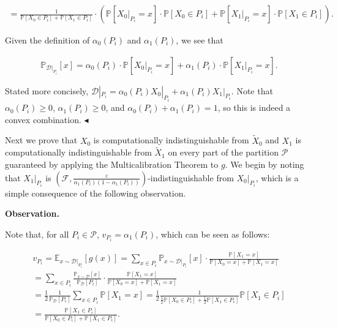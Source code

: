 \documentclass[10pt,a4paper]{article}
\begin{document}
\[\begin{gathered}
=\frac{1}{\mathbb{P}[X_{0}\in P_{i}]+\mathbb{P}[X_{1}\in P_{i}]}\cdot\left(\mathbb{P}[X_{0}|_{P_{i}}=x]\cdot\mathbb{P}[X_{0}\in P_{i}]+\mathbb{P}[X_{1}|_{P_{i}}=x]\cdot\mathbb{P}[X_{1}\in P_{i}]\right).
\end{gathered}\]


Given the definition of $\alpha_{0}(P_{i})$ and $\alpha_{1}(P_{i})$, we see that\par


\[\begin{gathered}
\mathbb{P}_{\mathcal{D}|_{P_{i}}}[x]=\alpha_{0}(P_{i})\cdot\mathbb{P}[X_{0}|_{P_{i}}=x]+\alpha_{1}(P_{i})\cdot\mathbb{P}[X_{1}|_{P_{i}}=x].
\end{gathered}\]


Stated more concisely, $\mathcal{D}|_{P_{i}}=\alpha_{0}(P_{i})X_{0}|_{P_{i}}+\alpha_{1}(P_{i})X_{1}|_{P_{i}}$. Note that $\alpha_{0}(P_{i})\geq 0$, $\alpha_{1}(P_{i})\geq 0$, and $\alpha_{0}(P_{i})+\alpha_{1}(P_{i})=1$, so this is indeed a convex combination.
$\blacktriangleleft$\par




Next we prove that $X_{0}$ is computationally indistinguishable from $\widetilde{X}_{0}$ and $X_{1}$ is computationally indistinguishable from $\widetilde{X}_{1}$ on every part of the partition $\mathcal{P}$ guaranteed by applying the Multicalibration Theorem to $g$. We begin by noting that $X_{1}|_{P_{i}}$ is $(\mathcal{F},\frac{\varepsilon}{\alpha_{1}(P_{i})(1-\alpha_{1}(P_{i}))})$-indistinguishable from $X_{0}|_{P_{i}}$, which is a simple consequence of the following observation.\par





\par\medskip\noindent\textbf{Observation.}\par




Note that, for all $P_{i}\in\mathcal{P}$, $v_{P_{i}}=\alpha_{1}(P_{i})$, which can be seen as follows:\par


\[\begin{gathered}
\displaystyle v_{P_{i}} \displaystyle=\mathbb{E}_{x\sim\mathcal{D}|_{P_{i}}}[g(x)]=\sum_{x\in P_{i}}\mathbb{P}_{x\sim\mathcal{D}|_{P_{i}}}[x]\cdot\frac{\mathbb{P}[X_{1}=x]}{\mathbb{P}[X_{0}=x]+\mathbb{P}[X_{1}=x]} \\
\displaystyle=\sum_{x\in P_{i}}\frac{\mathbb{P}_{x\sim\mathcal{D}}[x]}{\mathbb{P}_{\mathcal{D}}[P_{i}]}\cdot\frac{\mathbb{P}[X_{1}=x]}{\mathbb{P}[X_{0}=x]+\mathbb{P}[X_{1}=x]} \\
\displaystyle=\frac{1}{2}\frac{1}{\mathbb{P}_{\mathcal{D}}[P_{i}]}\sum_{x\in P_{i}}\mathbb{P}[X_{1}=x]=\frac{1}{2}\frac{1}{\frac{1}{2}\mathbb{P}[X_{0}\in P_{i}]+\frac{1}{2}\mathbb{P}[X_{1}\in P_{i}]}\mathbb{P}[X_{1}\in P_{i}] \\
\displaystyle=\frac{\mathbb{P}[X_{1}\in P_{i}]}{\mathbb{P}[X_{0}\in P_{i}]+\mathbb{P}[X_{1}\in P_{i}]}.
\end{gathered}\]
\end{document}
